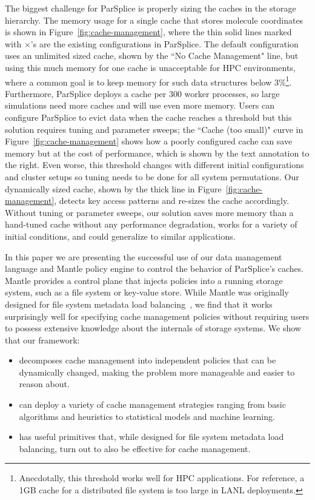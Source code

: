 The biggest challenge for ParSplice is properly sizing the caches in the
storage hierarchy.  The memory usage for a single cache that stores molecule
coordinates is shown in Figure~\ref{fig:cache-management}, where the thin solid
lines marked with \(\times\)'s are the existing configurations in ParSplice.
The default configuration uses an unlimited sized cache, shown by the ``No
Cache Management" line, but using this much memory for one cache is
unacceptable for HPC environments, where a common goal is to keep memory for
such data structures below 3\%\footnote{Anecdotally, this threshold works well
for HPC applications.  For reference, a 1GB cache for a distributed file system
is too large in LANL deployments.}. Furthermore, ParSplice deploys a cache per
300 worker processes, so large simulations need more caches and will use even
more memory.  Users can configure ParSplice to evict data when the cache
reaches a threshold but this solution requires tuning and parameter sweeps; the
``Cache (too small)" curve in Figure~\ref{fig:cache-management} shows how a
poorly configured cache can save memory but at the cost of performance, which
is shown by the text annotation to the right.  Even worse, this threshold
changes with different initial configurations and cluster setups so tuning
needs to be done for all system permutations.  Our dynamically sized cache,
shown by the thick line in Figure~\ref{fig:cache-management}, detects key
access patterns and re-sizes the cache accordingly.  Without tuning or
parameter sweeps, our solution saves more memory than a hand-tuned cache
without any performance degradation, works for a variety of initial conditions,
and could generalize to similar applications.


In this paper we are presenting the successful use of our data management
language and Mantle policy engine to control the behavior of ParSplice's
caches. Mantle provides a control plane that injects policies into a running
storage system, such as a file system or key-value store. While Mantle was
originally designed for file system metadata load
balancing~\cite{sevilla:sc15-mantle}, we find that it works surprisingly well
for specifying cache management policies without requiring users to possess
extensive knowledge about the internals of storage systems. We show that our
framework:

\begin{itemize}

  \item decomposes cache management into independent policies that can be
  dynamically changed, making the problem more manageable and easier to reason
  about.

  \item can deploy a variety of cache management strategies ranging from basic
  algorithms and heuristics to statistical models and machine learning.

  \item has useful primitives that, while designed for file system metadata
  load balancing, turn out to also be effective for cache management. 

\end{itemize}

